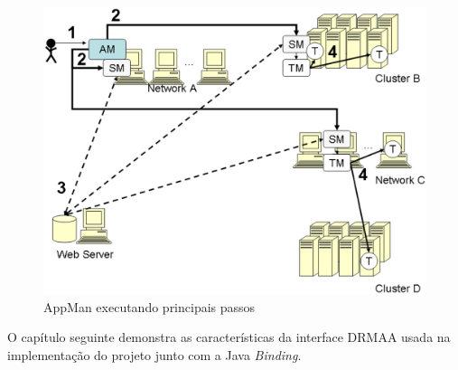 \begin{figure}[htb]
\begin{center}
\includegraphics[scale=0.13]{./img/AppMan.eps}
\caption{AppMan executando principais passos}
\label{fig:AppMan}
\end{center}
\end{figure}

O capítulo seguinte demonstra as características da interface DRMAA usada na implementação do projeto junto com a Java \emph{Binding}.